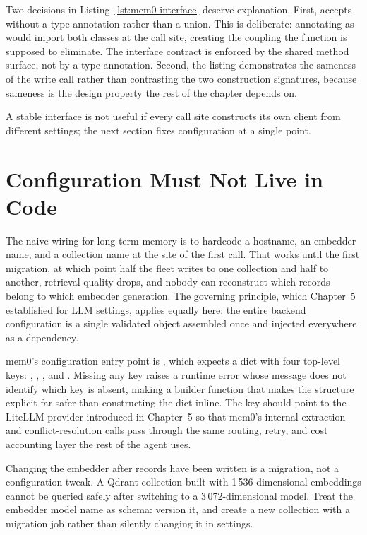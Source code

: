 Two decisions in Listing~\ref{lst:mem0-interface} deserve explanation.
First,  accepts  without a type annotation
rather than a union. This is deliberate: annotating as  would import both classes at the call site, creating the coupling
the function is supposed to eliminate. The interface contract is enforced by
the shared method surface, not by a type annotation. Second, the listing
demonstrates the sameness of the write call rather than contrasting the
two construction signatures, because sameness is the design property the
rest of the chapter depends on.

A stable interface is not useful if every call site constructs its own client
from different settings; the next section fixes configuration at a single point.

\section{Configuration Must Not Live in Code}
\label{sec:config-not-code}

The naive wiring for long-term memory is to hardcode a hostname, an
embedder name, and a collection name at the site of the first 
call. That works until the first migration, at which point half the fleet
writes to one collection and half to another, retrieval quality drops, and
nobody can reconstruct which records belong to which embedder generation.
The governing principle, which Chapter~5 established for LLM settings, applies
equally here: the entire backend configuration is a single validated object
assembled once and injected everywhere as a dependency.

mem0's configuration entry point is ,
which expects a dict with four top-level keys: ,
, , and . Missing
any key raises a runtime error whose message does not identify which key is
absent, making a builder function that makes the structure explicit far safer
than constructing the dict inline. The  key should point to the
LiteLLM provider introduced in Chapter~5 so that mem0's internal extraction
and conflict-resolution calls pass through the same routing, retry, and cost
accounting layer the rest of the agent uses.

\begin{warningbox}
Changing the embedder after records have been written is a migration, not a
configuration tweak. A Qdrant collection built with 1\,536-dimensional
embeddings cannot be queried safely after switching to a 3\,072-dimensional
model. Treat the embedder model name as schema: version it, and create a new
collection with a migration job rather than silently changing it in settings.
\end{warningbox}

